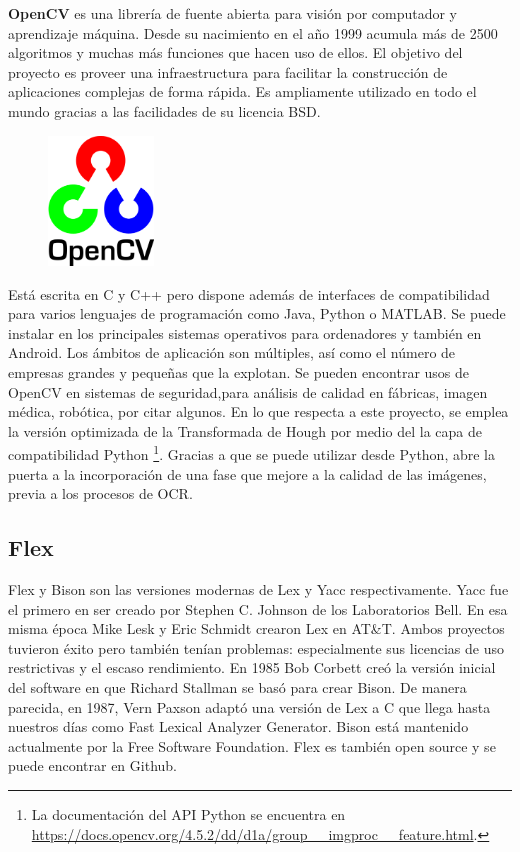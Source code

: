 \textbf{OpenCV} \cite{opencvTeam_oficialSite_main} es una librería de fuente abierta para visión por computador y aprendizaje máquina. Desde su nacimiento en el año 1999 acumula más de 2500 algoritmos y muchas más funciones que hacen uso de ellos. El objetivo del proyecto es proveer una infraestructura para facilitar la construcción de aplicaciones complejas de forma rápida. Es ampliamente utilizado en todo el mundo gracias a las facilidades de su licencia BSD. 

\begin{figure}
    \centering
    \includegraphics[width=0.25\textwidth]{imaxes/e-fundamentos-tecnologicos/logo-opencv.png}
\end{figure}

Está escrita en C y C++ pero dispone además de interfaces de compatibilidad para varios lenguajes de programación como Java, Python o MATLAB. Se puede instalar en los principales sistemas operativos para ordenadores y también en Android. Los ámbitos de aplicación son múltiples, así como el número de empresas grandes y pequeñas que la explotan. Se pueden encontrar usos de OpenCV en sistemas de seguridad,para análisis de calidad en fábricas, imagen médica, robótica, por citar algunos. En lo que respecta a este proyecto, se emplea la versión optimizada de la Transformada de Hough por medio del la capa de compatibilidad Python \footnote{La documentación del API Python se encuentra en \url{https://docs.opencv.org/4.5.2/dd/d1a/group__imgproc__feature.html}.}. Gracias a que se puede utilizar desde Python, abre la puerta a la incorporación de una fase que mejore a la calidad de las imágenes, previa a los procesos de OCR.

\subsection{Flex}
\label{subsec:flex}

Flex y Bison son las versiones modernas de Lex y Yacc respectivamente. Yacc fue el primero en ser creado por Stephen C. Johnson de los Laboratorios Bell. En esa misma época Mike Lesk y Eric Schmidt crearon Lex en AT\&T. Ambos proyectos tuvieron éxito pero también tenían problemas: especialmente sus licencias de uso restrictivas y el escaso rendimiento.
En 1985 Bob Corbett creó la versión inicial del software en que Richard Stallman se basó para crear Bison. De manera parecida, en 1987, Vern Paxson adaptó una versión de Lex a C que llega hasta nuestros días como Fast Lexical Analyzer Generator. Bison está mantenido actualmente por la Free Software Foundation. Flex es también open source y se puede encontrar en Github.

